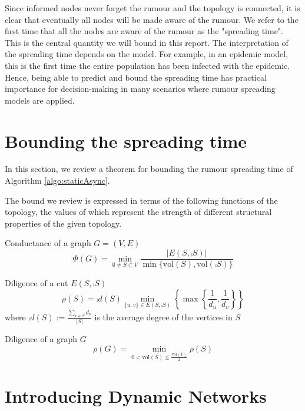 Since informed nodes never forget the rumour and the topology is connected, it is clear that eventually all nodes will be made aware of the rumour. We refer to the first time that all the nodes are aware of the rumour as the "spreading time". This is the central quantity we will bound in this report. The interpretation of the spreading time depends on the model. For example, in an epidemic model, this is the first time the entire population has been infected with the epidemic. Hence, being able to predict and bound the spreading time has practical importance for decision-making in many scenarios where rumour spreading models are applied.

\section{Bounding the spreading time}\label{section:graphMetrics}

In this section, we review a theorem for bounding the rumour spreading time of Algorithm \ref{algo:staticAsync}.

The bound we review is expressed in terms of the following functions of the topology, the values of which represent the strength of different structural properties of the given topology.


\begin{definition}
	Conductance of a graph $G = (V, E)$
	$$
		\Phi(G) = \min_{\emptyset \neq S \subset V} \frac{|E(S, \comp{S})|}{\min\{\text{vol}(S), \text{vol}(\comp{S})\}}
	$$
\end{definition}

\begin{definition}
	Diligence of a cut $ E(S, \comp{S}) $
	$$
		\rho(S) = \comp{d}(S) \min_{\{u, v\} \in E(S, \comp{S}) } \left\{ \max \left\{ \frac{1}{d_u},\frac{1}{d_v} \right\} \right\}
	$$ 
	where $\comp{d}(S) := \frac{\sum_{v \in S} d_v}{|S|}$ is the average degree of the vertices in $S$
\end{definition}

\begin{definition}
	Diligence of a graph $G$
	$$
		\rho(G) = \min_{0 < \text{vol}(S) \leq \frac{\text{vol}(V)}{2}} \rho(S) 
	$$
\end{definition}

\section{Introducing Dynamic Networks}

